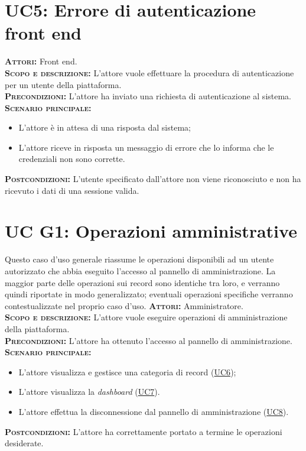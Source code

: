 \section{UC5: Errore di autenticazione front end}
\label{sec:UC5}
\textsc{\textbf{Attori:}} Front end.\\
\textsc{\textbf{Scopo e descrizione:}} L'attore vuole effettuare la procedura di autenticazione per un utente della piattaforma.\\
\textsc{\textsc{\textbf{Precondizioni:}}} L'attore ha inviato una richiesta di autenticazione al sistema.\\
\textsc{\textbf{Scenario principale:}} 
\begin{itemize}
    \item L'attore è in attesa di una risposta dal sistema;
    \item L'attore riceve in risposta un messaggio di errore che lo informa che le credenziali non sono corrette.
\end{itemize}
\textsc{\textbf{Postcondizioni:}} L'utente specificato dall'attore non viene riconosciuto e non ha ricevuto i dati di una sessione valida.

\section{UC G1: Operazioni amministrative}
\label{sec:ucg1}
Questo caso d'uso generale riassume le operazioni disponibili ad un utente autorizzato che abbia eseguito l'accesso al pannello di amministrazione. La maggior parte delle operazioni sui record sono identiche tra loro, e verranno quindi riportate in modo generalizzato; eventuali operazioni specifiche verranno contestualizzate nel proprio caso d'uso.
\textsc{\textbf{Attori:}} Amministratore.\\
\textsc{\textbf{Scopo e descrizione:}} L'attore vuole eseguire operazioni di amministrazione della piattaforma.\\
\textsc{\textsc{\textbf{Precondizioni:}}} L'attore ha ottenuto l'accesso al pannello di amministrazione.\\
\textsc{\textbf{Scenario principale:}} 
\begin{itemize}
    \item L'attore visualizza e gestisce una categoria di record (\hyperref[sec:UC6]{UC6});
    \item L'attore visualizza la \textit{dashboard} (\hyperref[sec:UC7]{UC7}).
    \item L'attore effettua la disconnessione dal pannello di amministrazione (\hyperref[sec:UC8]{UC8}).
\end{itemize}
\textsc{\textbf{Postcondizioni:}} L'attore ha correttamente portato a termine le operazioni desiderate.

